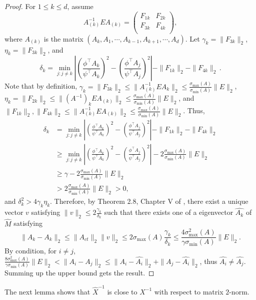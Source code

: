\begin{proof}
For $1\le k\le d$, assume 
\[
A_{(k)}^{-1} E A_{(k)} =  
\left(
\begin{array}{cc}
F_{1k} & F_{2k}\\
F_{3k} & F_{4k} \\
\end{array} 
\right), 
\]
where $A_{(k)}$ is the matrix $(A_k, A_1, \cdots, A_{k-1}, A_{k+1}, \cdots, A_d)$.
Let $\gamma_k = \|F_{3k}\|_2$, $\eta_k = \|F_{3k}\|_2$, and 
\[
\delta_k = \min_{j: j\neq k} 
\left\vert \left(\frac{\phi^{\top}A_k}{\psi^{\top}A_k}\right)^2 -\left( \frac{\phi^{\top}A_j}{\psi^{\top}A_j}\right)^2 \right\vert - \|F_{1k}\|_2 - \|F_{4k}\|_2\,.
\]
Note that by definition, $\gamma_k = \|F_{3k}\|_2\le\|A_{(k)}^{-1}EA_{k}\|_2\le\frac{\sigma_{\max}(A)}{\sigma_{\min}(A)}\|E\|_2$,
 $\eta_k = \|F_{2k}\|_2\le\|(A^{-1})_kEA_{(k)}\|_2\le\frac{\sigma_{\max}(A)}{\sigma_{\min}(A)}\|E\|_2$, 
 and $\|F_{1k}\|_2,\|F_{4k}\|_2\le\|A_{(k)}^{-1} E A_{(k)}\|_2\le\frac{\sigma_{\max}(A)}{\sigma_{\min}(A)}\|E\|_2$. 
 Thus,
\begin{align*}
\delta_k & = \min_{j:j\neq k} 
	\left\vert \left(\frac{\phi^{\top}A_k}{\psi^{\top}A_k}\right)^2 - \left(\frac{\phi^{\top}A_j}{\psi^{\top}A_j}\right)^2 \right\vert - \|F_{1k}\|_2 - \|F_{4k}\|_2\\
	& \ge \min_{j:j\neq k} \left\vert \left(\frac{\phi^{\top}A_k}{\psi^{\top}A_k}\right)^2 - \left(\frac{\phi^{\top}A_j}{\psi^{\top}A_j}\right)^2 \right\vert - 2 \frac{\sigma_{\max}(A)}{\sigma_{\min}(A)}\|E\|_2\\
	& \ge  \gamma -  2 \frac{\sigma_{\max}(A)}{\sigma_{\min}(A)}\|E\|_2 \\
	& >  2 \frac{\sigma_{\max}(A)}{\sigma_{\min}(A)}\|E\|_2 >0,
\end{align*}
and $\delta_k^2 > 4\gamma_k\eta_k$. 
Therefore, by Theorem 2.8, Chapter V of \citep{stewart1990matrix}, there exist a unique vector $v$ satisfying $\|v\|_2\le 2\frac{\gamma_k}{\delta_k}$ such that there exists one of a eigenvector $\widehat{A_k}$ of $\widehat{M}$ satisfying
 \[
 \|\widehat{A_k} - A_k\|_2 \le \|A_{ct}\|_2 \|v\|_2 \le 2\sigma_{\max}(A)\frac{\gamma_k}{\delta_k}
 \le 
 \frac{4\sigma_{\max}^2(A)}{\gamma \sigma_{\min}(A) } \|E\|_2.
 \]
 By condition, for $i\neq j$,  $\frac{8\sigma_{\max}^2(A)}{\gamma \sigma_{\min}(A) } \|E\|_2 < \|A_i - A_j\|_2\le \|A_i - \widehat{A_i}\|_2 + \|A_j - \widehat{A_i}\|_2$, thus $\widehat{A_i} \neq \widehat{A_j}$.  Summing up the upper bound gets the result. 
\end{proof}
The next lemma shows that $\widehat{X}^{-1}$ is close to $X^{-1}$ with respect to  matrix $2$-norm.
